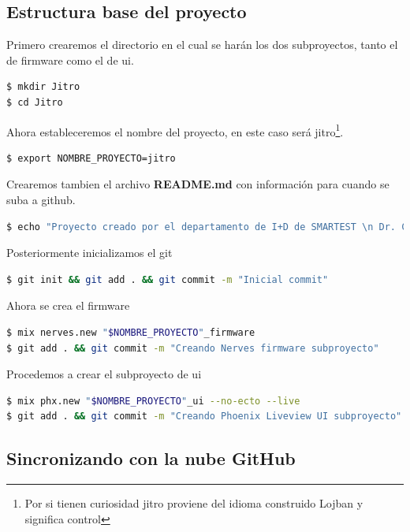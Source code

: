 \subsection{Estructura base del proyecto}

Primero crearemos el directorio en el cual se harán los dos subproyectos, tanto el de firmware como el de ui.

\begin{lstlisting}[language=bash]
$ mkdir Jitro 
$ cd Jitro
\end{lstlisting}

Ahora estableceremos el nombre del proyecto, en este caso será jitro\footnote{Por si tienen curiosidad jitro proviene del idioma construido Lojban y significa control}.

\begin{lstlisting}[language=bash]
$ export NOMBRE_PROYECTO=jitro
\end{lstlisting}

Crearemos tambien el archivo \textbf{README.md} con información para cuando se suba a github.

\begin{lstlisting}[language=bash]
$ echo "Proyecto creado por el departamento de I+D de SMARTEST \n Dr. Casimiro Gomez Gonzalez\\n 2021" > README.md
\end{lstlisting}


Posteriormente inicializamos el git

\begin{lstlisting}[language=bash]
$ git init && git add . && git commit -m "Inicial commit"
\end{lstlisting}

Ahora se crea el firmware 

\begin{lstlisting}[language=bash]
$ mix nerves.new "$NOMBRE_PROYECTO"_firmware
$ git add . && git commit -m "Creando Nerves firmware subproyecto"
\end{lstlisting}

Procedemos a crear el subproyecto de ui

\begin{lstlisting}[language=bash]
$ mix phx.new "$NOMBRE_PROYECTO"_ui --no-ecto --live 
$ git add . && git commit -m "Creando Phoenix Liveview UI subproyecto"
\end{lstlisting}

\subsection{Sincronizando con la nube GitHub}

